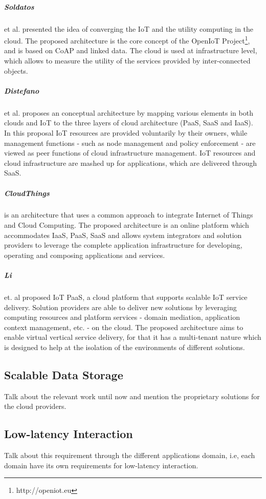 \subparagraph{Soldatos} et al. \cite{soldatos2012convergence} presented the idea of converging the IoT and the utility computing in the
cloud. The proposed architecture is the core concept of the OpenIoT Project\footnote{http://openiot.eu},
and is based on CoAP \cite{shelby2014constrained} and linked data. The cloud is used at infrastructure
level, which allows to measure the utility of the services provided by inter-connected objects.
\subparagraph{Distefano} et al. \cite{distefano2012enabling} proposes an conceptual architecture by mapping various
elements in both clouds and IoT to the three layers of cloud architecture (\gls{PaaS}, \gls{SaaS} and \gls{IaaS}).
In this proposal IoT resources are provided voluntarily by their owners, while management functions
- such as node management and policy enforcement - are viewed as peer functions of cloud infrastructure
management. IoT resources and cloud infrastructure are mashed up for applications, which are delivered
through \gls{SaaS}.
\subparagraph{CloudThings} \cite{zhou2013cloudthings} is an architecture that uses a common
approach to integrate Internet of Things and Cloud Computing. The proposed architecture is an online
platform which accommodates \gls{IaaS}, \gls{PaaS}, \gls{SaaS} and allows system integrators and
solution providers to leverage the complete application infrastructure for developing, operating
and composing applications and services.
\subparagraph{Li} et. al \cite{li2013efficient} proposed IoT PaaS, a cloud platform that supports
scalable IoT service delivery. Solution providers are able to deliver new solutions by leveraging
computing resources and platform services - domain mediation, application context management, etc.
- on the cloud. The proposed architecture aims to enable virtual vertical service delivery, for that
it has a multi-tenant nature which is designed to help at the isolation of the environments of
different solutions.\\
\subsection{Scalable Data Storage}
\label{sub:data_storage}
Talk about the relevant work until now and mention the proprietary solutions for the cloud providers.
\subsection{Low-latency Interaction}
\label{sub:low_latency_interaction}
Talk about this requirement through the different applications domain, i.e, each domain have its own
requirements for low-latency interaction.
